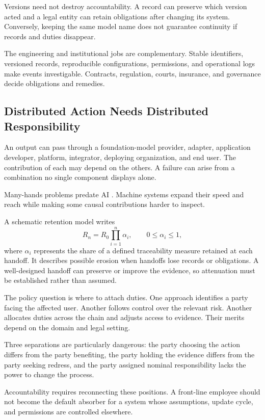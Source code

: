 \documentclass[11pt,openany]{book}
\begin{document}
Versions need not destroy accountability. A record can preserve which version acted and a legal entity can retain obligations after changing its system. Conversely, keeping the same model name does not guarantee continuity if records and duties disappear.

The engineering and institutional jobs are complementary. Stable identifiers, versioned records, reproducible configurations, permissions, and operational logs make events investigable. Contracts, regulation, courts, insurance, and governance decide obligations and remedies.

\subsection{Distributed Action Needs Distributed Responsibility}

An output can pass through a foundation-model provider, adapter, application developer, platform, integrator, deploying organization, and end user. The contribution of each may depend on the others. A failure can arise from a combination no single component displays alone.

Many-hands problems predate AI \cite{nissenbaum1996accountability,floridi2013distributed}. Machine systems expand their speed and reach while making some causal contributions harder to inspect.

A schematic retention model writes
\begin{equation}
 R_n=R_0\prod_{i=1}^{n}\alpha_i,
 \qquad 0\leq\alpha_i\leq1,
\end{equation}
where $\alpha_i$ represents the share of a defined traceability measure retained at each handoff. It describes possible erosion when handoffs lose records or obligations. A well-designed handoff can preserve or improve the evidence, so attenuation must be established rather than assumed.

The policy question is where to attach duties. One approach identifies a party facing the affected user. Another follows control over the relevant risk. Another allocates duties across the chain and adjusts access to evidence. Their merits depend on the domain and legal setting.

Three separations are particularly dangerous: the party choosing the action differs from the party benefiting, the party holding the evidence differs from the party seeking redress, and the party assigned nominal responsibility lacks the power to change the process.

Accountability requires reconnecting these positions. A front-line employee should not become the default absorber for a system whose assumptions, update cycle, and permissions are controlled elsewhere.
\end{document}
